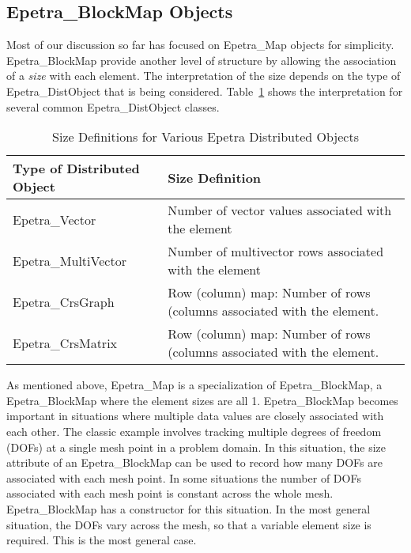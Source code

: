 \documentclass[12pt,relax]{EpetraUserGuide}
\newcommand{\map}{Epetra\_Map}
\newcommand{\blockmap}{Epetra\_BlockMap}
\renewcommand{\vector}{Epetra\_Vector}
\newcommand{\multivector}{Epetra\_MultiVector}
\newcommand{\crsgraph}{Epetra\_CrsGraph}
\newcommand{\crsmatrix}{Epetra\_CrsMatrix}
\newcommand{\distobject}{Epetra\_DistObject}
\begin{document}

\subsection{\blockmap{} Objects}

Most of our discussion so far has focused on \map{} objects for simplicity.  \blockmap{}
provide another level of structure by allowing the association of a {\it size} with each
element.  The interpretation of the size depends on the type of \distobject{} that is
being considered.  Table~\ref{Table:SizeDefinitions} shows the interpretation for several
common \distobject{} classes.
\begin{table}
\begin{center}
\begin{tabular}{ | p{7.5cm} | p{7.5cm} | }
\hline\hline
Type of Distributed Object & Size Definition \\\hline
\vector{} & Number of vector values associated with the element \\\hline
\multivector{} & Number of multivector rows associated with the element \\\hline
\crsgraph{} & Row (column) map: Number of rows (columns associated with the element. \\\hline
\crsmatrix{} & Row (column) map: Number of rows (columns associated with the element. \\\hline
\hline
\end{tabular}
\caption{Size Definitions for Various Epetra Distributed Objects}
\label{Table:SizeDefinitions}
\end{center}
\end{table}

As mentioned above, \map{} is a specialization of \blockmap{}, a \blockmap{} where the
element sizes are all 1.  \blockmap{} becomes important in situations where multiple data values
are closely associated with each other.  The classic example involves tracking multiple degrees of
freedom (DOFs) at a single mesh point in a problem domain.  In this situation, the size attribute of an
\blockmap{} can be used to record how many DOFs are associated with each mesh point.  In some situations
the number of DOFs associated with each mesh point is constant across the whole mesh.  \blockmap{} has
a constructor for this situation.  In the most general situation, the DOFs vary across the mesh, so that
a variable element size is required.  This is the most general case.
\end{document}
